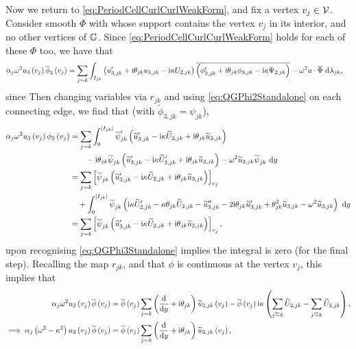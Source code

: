 Now we return to \eqref{eq:PeriodCellCurlCurlWeakForm}, and fix a vertex $v_j\in\mathcal{V}$.
Consider smooth $\Phi$ with whose support contains the vertex $v_j$ in its interior, and no other vertices of $\mathbb{G}$.
Since \eqref{eq:PeriodCellCurlCurlWeakForm} holds for each of these $\Phi$ too, we have that
\begin{align*}
	\alpha_j \omega^2 u_3\left( v_j \right) \overline{\phi}_3\left( v_j \right) &= \sum_{j\sim k} \int_{I_{jk}} \left( u'_{3,jk} + \mathrm{i}\theta_{jk} u_{3,jk} - \mathrm{i}\kappa U_{2,jk} \right)\overline{\left( \phi'_{3,jk} + \mathrm{i}\theta_{jk} \phi_{3,jk} - \mathrm{i}\kappa \Psi_{2,jk} \right)} - \omega^2 u\cdot\overline{\Phi}  \ \mathrm{d}\lambda_{jk},
\end{align*}
since 
Then changing variables via $r_{jk}$ and using \eqref{eq:QGPhi2Standalone} on each connecting edge, we find that (with $\widetilde{\phi}_{3,jk} = \psi_{jk}$),
\begin{align*}
	\alpha_j \omega^2 u_3\left( v_j \right) \phi_3\left( v_j \right)
	 &= \sum_{j\sim k} \int_0^{\left\lvert I_{jk} \right\rvert} 	\overline{\psi}'_{jk} \left(  \widetilde{u}'_{3,jk} - \mathrm{i}\kappa\widetilde{U}_{2,jk} + \mathrm{i}\theta_{jk}\widetilde{u}_{3,jk}  \right) \\
		&\qquad -\mathrm{i}\theta_{jk}\overline{\psi}_{jk}\left(  \widetilde{u}'_{3,jk} - \mathrm{i}\kappa\widetilde{U}'_{2,jk} + \mathrm{i}\theta_{jk}\widetilde{u}_{3,jk}  \right)
		- \omega^2 \widetilde{u}_{3,jk}\overline{\psi}_{jk} \ \mathrm{d} y \\
	&= \sum_{j\sim k}\left[  \overline{\psi}_{jk}\left(  \widetilde{u}'_{3,jk} - \mathrm{i}\kappa\widetilde{U}_{2,jk} + \mathrm{i}\theta_{jk}\widetilde{u}_{3,jk}  \right)  \right]_{v_j} \\
	&\quad + \int_0^{\left\lvert I_{jk} \right\rvert} \overline{\psi}_{jk} \left(  \mathrm{i}\kappa\widetilde{U}'_{2,jk} - \kappa\theta_{jk}\widetilde{U}_{2,jk} - \widetilde{u}''_{3,jk} - 2\mathrm{i}\theta_{jk}\widetilde{u}'_{3,jk} + \theta_{jk}^2\widetilde{u}_{3,jk} - \omega^2\widetilde{u}_{3,jk}  \right) \ \mathrm{d} y \\
	&= \sum_{j\sim k}\left[  \overline{\psi}_{jk}\left(  \widetilde{u}'_{3,jk} - \mathrm{i}\kappa\widetilde{U}_{2,jk} + \mathrm{i}\theta_{jk}\widetilde{u}_{3,jk}  \right)  \right]_{v_j}, 
\end{align*}
upon recognising \eqref{eq:QGPhi3Standalone} implies the integral is zero (for the final step).
Recalling the map $r_{jk}$, and that $\phi$ is continuous at the vertex $v_j$, this implies that
\begin{align*}
	\alpha_j \omega^2 u_3\bracs{v_j} \overline{\phi}\bracs{v_j} &= \overline{\phi}\bracs{v_j}\sum_{j\con k} \bracs{ \diff{}{y} + \rmi\qm_{jk} }\widetilde{u}_{3,jk}\bracs{v_j} 
	- \overline{\phi}\bracs{v_j}\rmi\wavenumber\bracs{ \sum_{j\conRight k} \widetilde{U}_{2,jk} - \sum_{j\conLeft k} \widetilde{U}_{2,jk} }, \\
	\implies \alpha_j \bracs{\omega^2 - \wavenumber^2} u_3\bracs{v_j} \overline{\phi}\bracs{v_j} &= \overline{\phi}\bracs{v_j} \sum_{j\con k} \bracs{ \diff{}{y} + \rmi\qm_{jk} }\widetilde{u}_{3,jk}\bracs{v_j},
\end{align*}
